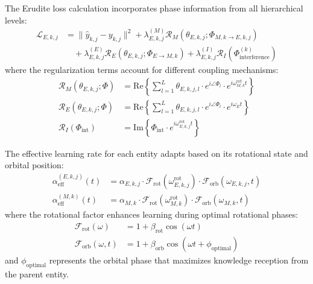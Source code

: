 \begin{theorem}
The Erudite loss calculation incorporates phase information from all hierarchical levels:
\begin{align}
\mathcal{L}_{E,k,j} &= \|\hat{y}_{k,j} - y_{k,j}\|^2 + \lambda_{E,k,j}^{(M)} \mathcal{R}_M(\theta_{E,k,j}; \Phi_{M,k \rightarrow E,k,j}) \\
&\quad + \lambda_{E,k,j}^{(E)} \mathcal{R}_E(\theta_{E,k,j}; \Phi_{E \rightarrow M,k}) + \lambda_{E,k,j}^{(I)} \mathcal{R}_I(\Phi_{\text{interference}}^{(k)})
\end{align}
where the regularization terms account for different coupling mechanisms:
\begin{align}
\mathcal{R}_M(\theta_{E,k,j}; \Phi) &= \text{Re}\left\{\sum_{l=1}^L \theta_{E,k,j,l} \cdot e^{i\angle \Phi_l} \cdot e^{i\omega_{M,k}^{\text{rot}} t}\right\} \\
\mathcal{R}_E(\theta_{E,k,j}; \Phi) &= \text{Re}\left\{\sum_{l=1}^L \theta_{E,k,j,l} \cdot e^{i\angle \Phi_l} \cdot e^{i\omega_E t}\right\} \\
\mathcal{R}_I(\Phi_{\text{int}}) &= \text{Im}\left\{\Phi_{\text{int}} \cdot e^{i\omega_{E,k,j}^{\text{rot}} t}\right\}
\end{align}
\end{theorem}

\begin{theorem}
The effective learning rate for each entity adapts based on its rotational state and orbital position:
\begin{align}
\alpha_{\text{eff}}^{(E,k,j)}(t) &= \alpha_{E,k,j} \cdot \mathcal{F}_{\text{rot}}(\omega_{E,k,j}^{\text{rot}}) \cdot \mathcal{F}_{\text{orb}}(\omega_{E,k,j}, t) \\
\alpha_{\text{eff}}^{(M,k)}(t) &= \alpha_{M,k} \cdot \mathcal{F}_{\text{rot}}(\omega_{M,k}^{\text{rot}}) \cdot \mathcal{F}_{\text{orb}}(\omega_{M,k}, t)
\end{align}
where the rotational factor enhances learning during optimal rotational phases:
\begin{align}
\mathcal{F}_{\text{rot}}(\omega) &= 1 + \beta_{\text{rot}} \cos(\omega t) \\
\mathcal{F}_{\text{orb}}(\omega, t) &= 1 + \beta_{\text{orb}} \cos(\omega t + \phi_{\text{optimal}})
\end{align}
and $\phi_{\text{optimal}}$ represents the orbital phase that maximizes knowledge reception from the parent entity.
\end{theorem}

